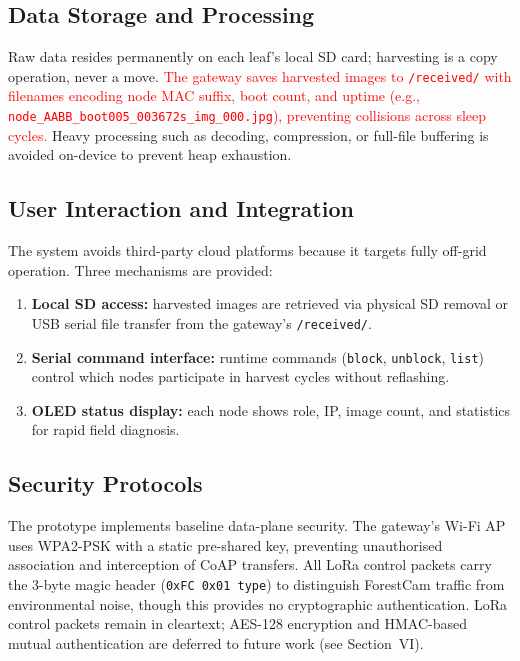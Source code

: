 \documentclass[12pt,a4paper]{article}
\newcommand{\changed}[1]{\textcolor{red}{#1}}
\begin{document}
\subsection{Data Storage and Processing}

Raw data resides permanently on each leaf's local SD card; harvesting is a copy operation, never a move. \changed{The gateway saves harvested images to \texttt{/received/} with filenames encoding node MAC suffix, boot count, and uptime (e.g., \texttt{node\_AABB\_boot005\_003672s\_img\_000.jpg}), preventing collisions across sleep cycles.} Heavy processing such as decoding, compression, or full-file buffering is avoided on-device to prevent heap exhaustion.

\subsection{User Interaction and Integration}

The system avoids third-party cloud platforms because it targets fully off-grid operation. Three mechanisms are provided:

\begin{enumerate}
    \item \textbf{Local SD access:} harvested images are retrieved via physical SD removal or USB serial file transfer from the gateway's \texttt{/received/}.
    \item \textbf{Serial command interface:} runtime commands (\texttt{block}, \texttt{unblock}, \texttt{list}) control which nodes participate in harvest cycles without reflashing.
    \item \textbf{OLED status display:} each node shows role, IP, image count, and statistics for rapid field diagnosis.
\end{enumerate}

\subsection{Security Protocols}

The prototype implements baseline data-plane security. The gateway's Wi-Fi AP uses WPA2-PSK with a static pre-shared key, preventing unauthorised association and interception of CoAP transfers. All LoRa control packets carry the 3-byte magic header (\texttt{0xFC 0x01 type}) to distinguish ForestCam traffic from environmental noise, though this provides no cryptographic authentication. LoRa control packets remain in cleartext; AES-128 encryption and HMAC-based mutual authentication are deferred to future work (see Section~VI).
\end{document}
